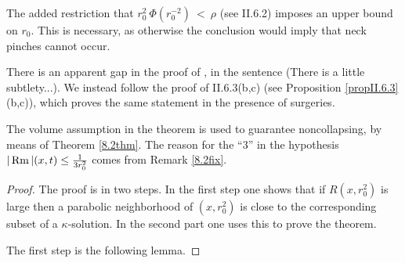 \begin{remark}
  \label{rem:kl-later-scalar-curvature-bounds-bigger-balls-from-curvature-volume-bounds-existence-noncollapsing}
 \label{rmkI.12.2}
The added restriction that $r_0^2 \: \Phi(r_0^{-2}) \: < \: \rho$ (see II.6.2)
imposes an upper bound on $r_0$.  This is necessary, as
otherwise the conclusion would imply that neck pinches cannot occur.

There is an apparent gap in the proof of \cite[Theorem 12.2]{Perelman},
in the sentence
(There is a little subtlety...).  We instead follow the proof
of II.6.3(b,c) (see Proposition \ref{propII.6.3}(b,c)),
which proves the same statement in the
presence of surgeries.


The volume assumption in the theorem is used to guarantee
noncollapsing, by means of Theorem \ref{8.2thm}. The reason
for the ``$3$'' in the hypothesis $|\operatorname{Rm}|(x, t) \le \frac{1}{3r_0^{2}}$
comes from Remark \ref{8.2fix}.
\end{remark}
\begin{proof}
The proof is in two steps.  In the first step one shows that
if $R(x, r_0^2)$ is large then a parabolic neighborhood of
$(x, r_0^2)$ is close to the corresponding subset of a
$\kappa$-solution.  In the second part one uses this to
prove the theorem.

The first step is the following lemma.

\end{proof}

